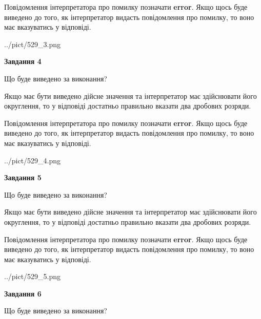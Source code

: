 \documentclass[12pt, ukrainian]{article}
\begin{document}
{\begin {Large}
Повідомлення інтерпретатора про помилку позначати \textbf{error}.
Якщо щось буде виведено до того, як інтерпретатор видасть повідомлення про помилку, 
то воно має вказуватись у відповіді. \par

\begin{center}
	{../pict/529_3.png}
\end{center}
\newpage

{\begin {center}\textbf{Завдання 4}\end {center}}\par
Що буде виведено за виконання? \par

Якщо має бути виведено дійсне значення та інтерпретатор має здійснювати його округлення, 
то у відповіді достатньо правильно вказати два дробових розряди.

Повідомлення інтерпретатора про помилку позначати \textbf{error}.
Якщо щось буде виведено до того, як інтерпретатор видасть повідомлення про помилку, 
то воно має вказуватись у відповіді. \par

\begin{center}
	{../pict/529_4.png}
\end{center}
\newpage

{\begin {center}\textbf{Завдання 5}\end {center}}\par
Що буде виведено за виконання? \par

Якщо має бути виведено дійсне значення та інтерпретатор має здійснювати його округлення, 
то у відповіді достатньо правильно вказати два дробових розряди.

Повідомлення інтерпретатора про помилку позначати \textbf{error}.
Якщо щось буде виведено до того, як інтерпретатор видасть повідомлення про помилку, 
то воно має вказуватись у відповіді. \par

\begin{center}
	{../pict/529_5.png}
\end{center}
\newpage

{\begin {center}\textbf{Завдання 6}\end {center}}\par
Що буде виведено за виконання? \par


\end{Large}}
\end{document}
